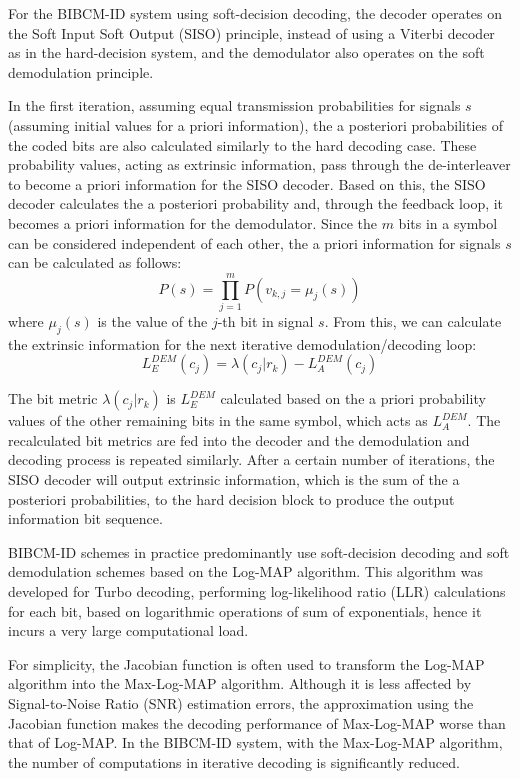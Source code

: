 \documentclass[a4paper,14pt]{extreport}
\begin{document}
For the BIBCM-ID system using soft-decision decoding, the decoder operates on the Soft Input Soft Output (SISO) principle, instead of using a Viterbi decoder as in the hard-decision system, and the demodulator also operates on the soft demodulation principle.

In the first iteration, assuming equal transmission probabilities for signals $s$ (assuming initial values for a priori information), the a posteriori probabilities of the coded bits are also calculated similarly to the hard decoding case. These probability values, acting as extrinsic information, pass through the de-interleaver to become a priori information for the SISO decoder. Based on this, the SISO decoder calculates the a posteriori probability and, through the feedback loop, it becomes a priori information for the demodulator. Since the $m$ bits in a symbol can be considered independent of each other, the a priori information for signals $s$ can be calculated as follows:
\begin{equation}
    P(s) = \prod_{j=1}^{m} P(v_{k,j} = \mu_j(s))
    \label{eq:priori_signal}
\end{equation}
where $\mu_j(s)$ is the value of the $j$-th bit in signal $s$. From this, we can calculate the extrinsic information for the next iterative demodulation/decoding loop:
\begin{equation}
    L_E^{DEM}(c_j) = \lambda(c_j | r_k) - L_A^{DEM}(c_j)
    \label{eq:extrinsic_dem}
\end{equation}

The bit metric $\lambda(c_j | r_k)$ is $L_E^{DEM}$ calculated based on the a priori probability values of the other remaining bits in the same symbol, which acts as $L_A^{DEM}$. The recalculated bit metrics are fed into the decoder and the demodulation and decoding process is repeated similarly. After a certain number of iterations, the SISO decoder will output extrinsic information, which is the sum of the a posteriori probabilities, to the hard decision block to produce the output information bit sequence.

BIBCM-ID schemes in practice predominantly use soft-decision decoding and soft demodulation schemes based on the Log-MAP algorithm. This algorithm was developed for Turbo decoding, performing log-likelihood ratio (LLR) calculations for each bit, based on logarithmic operations of sum of exponentials, hence it incurs a very large computational load.

For simplicity, the Jacobian function is often used to transform the Log-MAP algorithm into the Max-Log-MAP algorithm. Although it is less affected by Signal-to-Noise Ratio (SNR) estimation errors, the approximation using the Jacobian function makes the decoding performance of Max-Log-MAP worse than that of Log-MAP. In the BIBCM-ID system, with the Max-Log-MAP algorithm, the number of computations in iterative decoding is significantly reduced.
\end{document}

